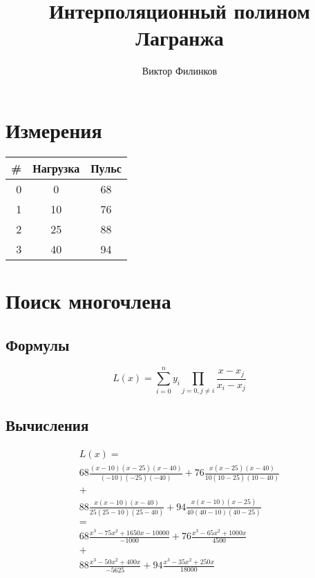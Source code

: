 \documentclass[oneside,final,14pt]{extreport}
\begin{document}
\title{Интерполяционный полином Лагранжа}
\author{Виктор Филинков}
\maketitle

\chapter*{Измерения}
\begin{table}[pht]
	\centering
	\begin{tabular}{|r | c | c|}
		\hline \textbf{\#} &  \textbf{Нагрузка} & \textbf{Пульс} \\ \hline
		0 & 0	&	68	\\ \hline
		1 & 10	&	76	\\ \hline
		2 & 25	&	88	\\ \hline
		3 & 40	&	94	\\ \hline
	\end{tabular}
	\label{measurements}
\end{table}

\chapter*{Поиск многочлена}
\section*{Формулы}

\[
	L(x)=\sum_{i=0}^{n} y_i \prod_{j = 0, j \ne i} \frac{x-x_j}{x_i-x_j}
\]

\section*{Вычисления}
\begin{multline*}
	L(x)= \\
	68 \frac{(x-10)(x-25)(x-40)}{(-10) (-25) (-40)}  + 
	76 \frac{x(x-25)(x-40)}{10(10-25)(10-40)} \\ + \\
	88 \frac{x(x-10)(x-40)}{25(25-10)(25-40)} +
	94 \frac{x(x-10)(x-25)}{40(40-10)(40-25)} \\ = \\
	68 \frac{x^3-75x^2+1650x-10000}{-1000} + %
	76 \frac{x^3-65x^2+1000x}{4500} \\ + \\
	88 \frac{x^3-50x^2+400x}{-5625} +
	94 \frac{x^3-35x^2+250x}{18000} \\
\end{multline*}
\end{document}
